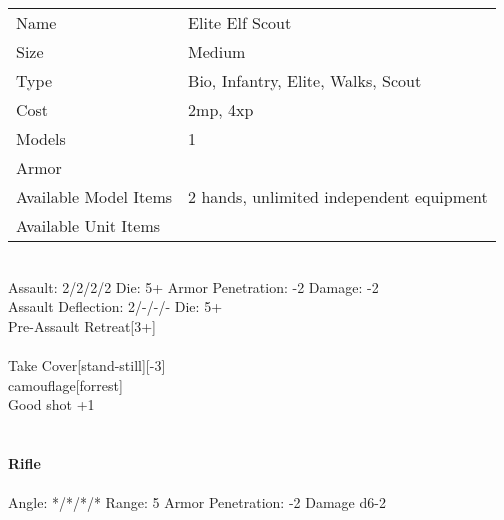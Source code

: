 \begin{tabular}{ll}
  Name & Elite Elf Scout \\
  Size & Medium\\
  Type & Bio, Infantry, Elite, Walks, Scout\\
  Cost & 2mp, 4xp\\
  Models & 1\\
  Armor & \\
  Available Model Items & 2 hands, unlimited independent equipment \\
  Available Unit Items &  \\
\end{tabular}

\ \\
Assault: 2/2/2/2 Die: 5+ Armor Penetration: -2 Damage: -2 \\
Assault Deflection: 2/-/-/- Die: 5+\\
\indent Pre-Assault Retreat[3+] \\
\ \\
Take Cover[stand-still][-3] \\ camouflage[forrest] \\ Good shot +1 \\ 
\ \\
\ \\
{\bf Rifle } \\
\ \\
Angle: */*/*/* Range: 5 Armor Penetration: -2 Damage d6-2 \\
\indent  \\





